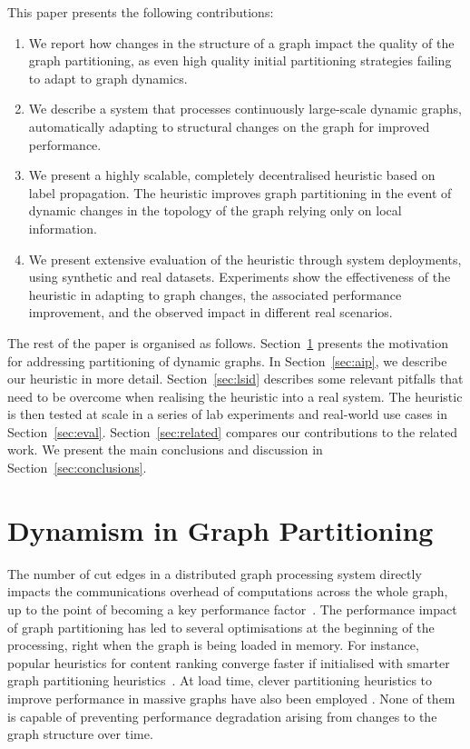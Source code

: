 \documentclass{sig-alternate-10pt}
\begin{document}
This paper presents the following contributions:
\begin{enumerate}
\item We report how changes in the structure of a graph impact the quality of the graph partitioning, as even high quality initial partitioning strategies failing to adapt to graph dynamics.
\item We describe a system that processes continuously large-scale dynamic graphs, automatically adapting to structural changes on the graph for improved performance.
\item We present a highly scalable, completely decentralised heuristic based on label propagation.
 The heuristic improves graph partitioning in the event of dynamic changes in the topology of the graph relying only on local information.
\item We present extensive evaluation of the heuristic through
system deployments, using synthetic and real datasets. Experiments show the effectiveness of the heuristic in adapting to graph changes, the associated performance improvement, and the observed impact in different real scenarios. 

\end{enumerate}

The rest of the paper is organised as follows. Section~\ref{sec:motiv} presents 
the motivation for addressing partitioning of dynamic graphs. In Section~\ref{sec:aip}, we
describe our heuristic in more detail. Section~\ref{sec:lsid} describes some
relevant pitfalls that need to be overcome when realising the heuristic into a
real system. The heuristic is then tested at scale in a series of lab
experiments and real-world use cases in Section~\ref{sec:eval}.
Section~\ref{sec:related} compares our contributions to the related
work. We present the main conclusions and discussion in
Section~\ref{sec:conclusions}.


\section{Dynamism in Graph Partitioning}
\label{sec:motiv}


The number of cut edges in a distributed graph processing system directly impacts the communications overhead of computations across the whole graph, up to the point of becoming a key performance factor~\cite{Malewicz2009}. The performance impact of graph partitioning has led to several optimisations at the beginning of the processing, right when the graph is being loaded in memory. For instance, popular heuristics for content ranking converge faster if initialised with smarter graph partitioning heuristics~\cite{Tong2006}. At load time, clever partitioning heuristics to improve performance in massive graphs have also been employed \cite{Ugander,Salihoglu2012,Stanton2012}. None of them is capable of preventing performance degradation arising from changes to the graph structure over time.
\end{document}
